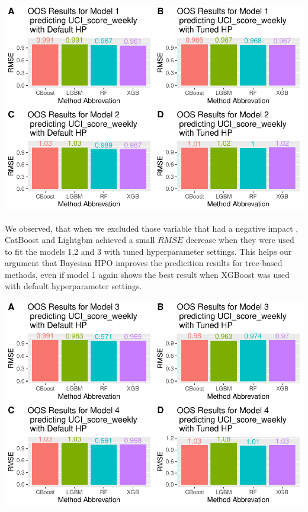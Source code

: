 \documentclass[12pt,a4paper]{article}
\let\origfigure\figure
\let\endorigfigure\endfigure
\renewenvironment{figure}[1][2] {
    \expandafter\origfigure\expandafter[H]
} {
    \endorigfigure
}
\begin{document}
\begin{figure}[!H]
\includegraphics{Master_Thesis_files/figure-latex/RMSE-UCI-irmi-new-avg-power-comb-1} \caption{results for UCI weekly points prediction with model 1 and 2 without \(height\), \(season\), \(age\), \(avg\_calories\) and \(avg\_elap\_time\_sec\)}\label{fig:RMSE-UCI-irmi-new-avg-power-comb}
\end{figure}

We observed, that when we excluded those variable that had a negative impact , CatBoost and Lightgbm achieved a small \(RMSE\) decrease when they were used to fit the models 1,2 and 3 with tuned hyperparameter settings. This helps our argument that Bayesian HPO improves the predicition results for tree-based methods, even if model 1 again shows the best result when XGBoost was used with default hyperparameter settings.



\begin{figure}[!H]
\includegraphics{Master_Thesis_files/figure-latex/RMSE-UCI-irmi-new-avg-power-1} \caption{results for UCI weekly points prediction with model 3 and 3 without \(height\), \(season\), \(age\), \(avg\_calories\) and \(avg\_elap\_time\_sec\)}\label{fig:RMSE-UCI-irmi-new-avg-power}
\end{figure}
\end{document}
